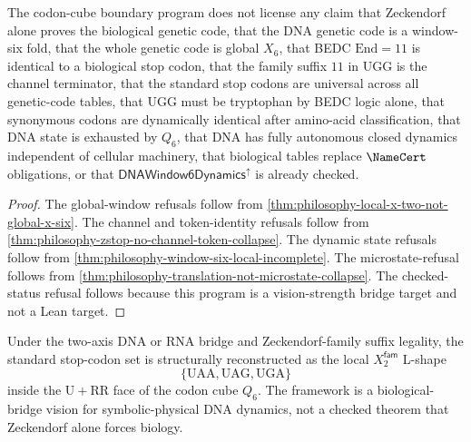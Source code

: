 \begin{theorem}
\label{thm:philosophy-codon-cube-boundary-cannot-claim}
The codon-cube boundary program does not license any claim that
Zeckendorf alone proves the biological genetic code, that the DNA
genetic code is a window-six fold, that the whole genetic code is
global $X_{6}$, that BEDC $\mathrm{End}=11$ is identical to a biological
stop codon, that the family suffix $11$ in $\mathrm{UGG}$ is the
channel terminator, that the standard stop codons are universal across
all genetic-code tables, that $\mathrm{UGG}$ must be tryptophan by BEDC
logic alone, that synonymous codons are dynamically identical after
amino-acid classification, that DNA state is exhausted by $Q_{6}$, that
DNA has fully autonomous closed dynamics independent of cellular
machinery, that biological tables replace $\NameCert$ obligations, or
that $\mathsf{DNAWindow6Dynamics}^{\uparrow}$ is already checked.
\end{theorem}
\begin{proof}
The global-window refusals follow from
\autoref{thm:philosophy-local-x-two-not-global-x-six}. The channel and
token-identity refusals follow from
\autoref{thm:philosophy-zstop-no-channel-token-collapse}. The dynamic
state refusals follow from
\autoref{thm:philosophy-window-six-local-incomplete}. The
microstate-refusal follows from
\autoref{thm:philosophy-translation-not-microstate-collapse}. The
checked-status refusal follows because this program is a
vision-strength bridge target and not a Lean target.
\end{proof}

\begin{corollary}
\label{cor:philosophy-codon-cube-boundary-allowed-claim}
Under the two-axis DNA or RNA bridge and Zeckendorf-family suffix
legality, the standard stop-codon set is structurally reconstructed as
the local $X_{2}^{\mathsf{fam}}$ L-shape
$$
  \{\mathrm{UAA},\mathrm{UAG},\mathrm{UGA}\}
$$
inside the $\mathrm{U}+\mathrm{RR}$ face of the codon cube $Q_{6}$. The
framework is a biological-bridge vision for symbolic-physical DNA
dynamics, not a checked theorem that Zeckendorf alone forces biology.
\end{corollary}
